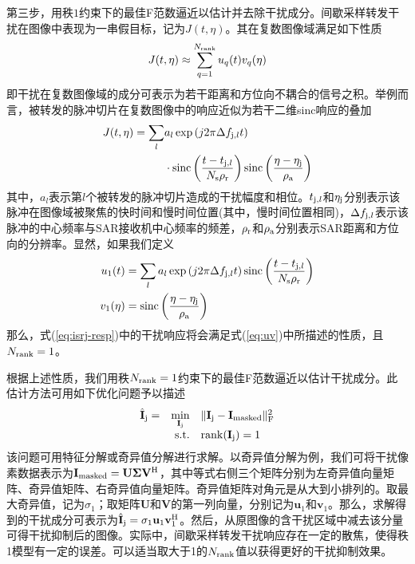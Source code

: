 \documentclass[10.5pt,UTF8]{JR}
\theoremstyle{mystyle}
\begin{document}
第三步，用秩$1$约束下的最佳F范数逼近以估计并去除干扰成分。间歇采样转发干扰在图像中表现为一串假目标，记为$J(t,\eta)$。其在复数图像域满足如下性质
\begin{equation}\label{eq:uv}
J(t,\eta) \approx \sum_{q=1}^{N_{\rm rank}} u_q(t) v_q(\eta)
\end{equation}
即干扰在复数图像域的成分可表示为若干距离和方位向不耦合的信号之积。举例而言，被转发的脉冲切片在复数图像中的响应近似为若干二维sinc响应的叠加
\begin{equation}\label{eq:isrj-resp}
\begin{split}
J(t,\eta)=
\sum_l &a_l \exp\left(j2\pi \Delta f_{{\rm j},l} t\right)\\
&\cdot{\rm \mathrm{sinc}}\left(\frac{t-t_{{\rm j},l}}{N_{\rm s}\rho_{\rm r}}\right) {\rm \mathrm{sinc}}\left(\frac{\eta-\eta_{{\rm j}}}{\rho_{\rm a}}\right)
\end{split}
\end{equation}
其中，$a_l$表示第$l$个被转发的脉冲切片造成的干扰幅度和相位。$t_{{\rm j},l}$和$\eta_{{\rm j}}$分别表示该脉冲在图像域被聚焦的快时间和慢时间位置(其中，慢时间位置相同)，$\Delta f_{{\rm j},l}$表示该脉冲的中心频率与SAR接收机中心频率的频差，$\rho_{\rm r}$和$\rho_{\rm a}$分别表示SAR距离和方位向的分辨率。显然，如果我们定义
\begin{align}\label{}
  u_1(t) & =\sum_l a_l \exp\left(j2\pi \Delta f_{{\rm j},l} t\right){\rm \mathrm{sinc}}\left(\frac{t-t_{{\rm j},l}}{N_{\rm s}\rho_{\rm r}}\right) \\
  v_1(\eta) & ={\rm \mathrm{sinc}}\left(\frac{\eta-\eta_{{\rm j}}}{\rho_{\rm a}}\right)
\end{align}
那么，式(\ref{eq:isrj-resp})中的干扰响应将会满足式(\ref{eq:uv})中所描述的性质，且$N_{\rm rank}=1$。

根据上述性质，我们用秩$N_{\rm rank}=1$约束下的最佳F范数逼近以估计干扰成分。此估计方法可用如下优化问题予以描述
\begin{equation}\label{eq:pca}
\begin{array}{rrl}
  \hat{\mathbf{I}}_{\rm j}  = &\min\limits_{\mathbf{I}_{\rm j} } & \|\mathbf{I}_{\rm j} -\mathbf{I}_{\rm masked}\|_{\rm F}^2 \\
 &  {\rm s. t.} & {\rm rank}(\mathbf{I}_{\rm j}) =1
\end{array}
\end{equation}
该问题可用特征分解或奇异值分解进行求解。以奇异值分解为例，我们可将干扰像素数据表示为$\mathbf{I}_{\rm masked} = \mathbf{U}\bm{\Sigma} \mathbf{V}^{\rm H}$，其中等式右侧三个矩阵分别为左奇异值向量矩阵、奇异值矩阵、右奇异值向量矩阵。奇异值矩阵对角元是从大到小排列的。取最大奇异值，记为$\sigma_1$；取矩阵$\mathbf{U}$和$\mathbf{V}$的第一列向量，分别记为$\mathbf{u}_1$和$\mathbf{v}_1$。那么，求解得到的干扰成分可表示为$\hat{\mathbf{I}}_{\rm j} = \sigma_1 \mathbf{u}_1 \mathbf{v}_1^{\rm H}$。然后，从原图像的含干扰区域中减去该分量可得干扰抑制后的图像。实际中，间歇采样转发干扰响应存在一定的散焦，使得秩1模型有一定的误差。可以适当取大于1的$N_{\rm rank}$值以获得更好的干扰抑制效果。
\end{document}
